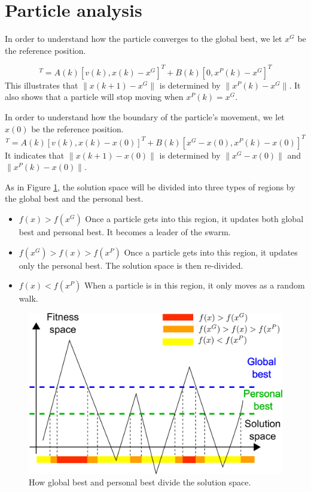\section{Particle analysis}
\label{sec:particle}

In order to understand how the particle converges to the global best, we let $ x^{G} $ be the reference position.

\begin{equation}
[ v(k+1), x(k+1) - x^{G} ]^{T} = A(k) [ v(k), x(k) - x^{G} ]^{T} + B(k) [ 0, x^{P}(k) - x^{G} ]^{T}
\end{equation}
This illustrates that $ \lVert x(k+1) - x^{G} \rVert $ is determined by $ \lVert x^{P}(k) - x^{G} \rVert $.
It also shows that a particle will stop moving when $ x^{P}(k) = x^{G} $.

In order to understand how the boundary of the particle's movement, we let $ x(0) $ be the reference position.
\begin{equation}
[ v(k+1), x(k+1) - x(0) ]^{T} = A(k) [ v(k), x(k) - x(0) ]^{T} + B(k) [ x^{G} - x(0), x^{P}(k) - x(0) ]^{T}
\end{equation}
It indicates that $ \lVert x(k+1) - x(0) \rVert  $ is determined by $ \lVert x^{G} - x(0) \rVert $ and $ \lVert x^{P}(k) - x(0) \rVert $.


As in Figure \ref{fig:categorize_regions}, the solution space will be divided into three types of regions by the global best and the personal best.
\begin{itemize}
\item $ f(x) > f(x^G) $
Once a particle gets into this region, it updates both global best and personal best. 
It becomes a leader of the swarm.
\item $ f(x^{G}) > f(x) > f(x^{P}) $
Once a particle gets into this region, it updates only the personal best.
The solution space is then re-divided.
\item $ f(x) < f(x^{P}) $
When a particle is in this region, it only moves as a random walk.
\end{itemize}

\begin{figure}
\centering
\includegraphics[width=0.7\linewidth]{./fig/categorize_regions}
\caption{How global best and personal best divide the solution space.}
\label{fig:categorize_regions}
\end{figure}

